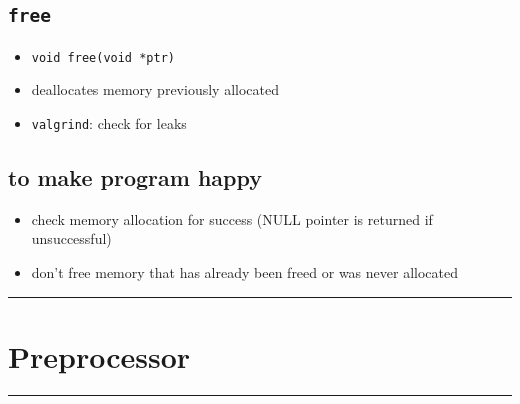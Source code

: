 \documentclass[10pt, multicolumn, a4paper]{article}
\begin{document}
\begin{multicols}{2}
	\subsection*{\texttt{free}}
	\begin{itemize}
	\item \verb|void free(void *ptr)|
	\item deallocates memory previously allocated 
	\item \verb|valgrind|: check for leaks
	\end{itemize}
	\subsection*{to make program happy}
	\begin{itemize}
	\item check memory allocation for success (NULL pointer is returned if unsuccessful)
	\item don't free memory that has already been freed or was never allocated
	\end{itemize}
\end{multicols}

\setcounter{section}{4}
\hrule
\section{Preprocessor}
\hrule 
\end{document}
